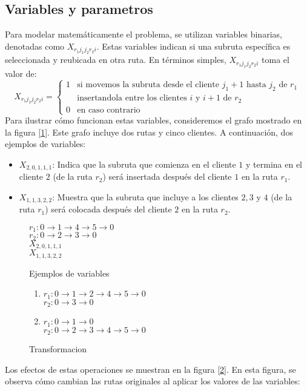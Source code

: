 \documentclass{article}
\begin{document}
\subsection {Variables y parametros}
Para modelar matemáticamente el problema, se utilizan variables binarias, denotadas como $X_{r_1 j_1 j_2 r_2 i}$. Estas variables indican si una subruta específica es seleccionada y reubicada en otra ruta. En términos simples, $X_{r_1 j_1 j_2 r_2 i}$ toma el valor de:
\[
 X_{r_1 j_1 j_2 r_2 i}= 
\begin{cases}  
    1 & \text{si movemos la subruta desde el cliente $j_1 +1 $ hasta $j_2$ de $r_1$} \\
       & \text{insertandola entre los clientes $i$ y $i+1$ de $r_2$}\\
    0 & \text{en caso contrario} 
\end{cases}
\]
Para ilustrar cómo funcionan estas variables, consideremos el grafo mostrado en la figura [\ref{fig:variables_example}]. Este grafo incluye dos rutas y cinco clientes. A continuación, dos ejemplos de variables:
\begin{itemize}
\item
$X_{2,0,1,1,1}$: Indica que la subruta que comienza en el cliente $1$ y termina en el cliente $2$ (de la ruta $r_2$) será insertada después del cliente $1$ en la ruta $r_1$.
\item
$X_{1,1,3,2,2}$: Muestra que la subruta que incluye a los clientes $2, 3$ y $4$ (de la ruta $r_1$) será colocada después del cliente $2$ en la ruta $r_2$.
\end{itemize}

\begin{figure}[h!]
    \vspace{0.5em}
$r_1:  0 \rightarrow 1\rightarrow 4 \rightarrow 5 \rightarrow 0$\\
$r_2:  0\rightarrow 2\rightarrow 3\rightarrow 0$\\
$X_{2,0,1,1,1}$\\
$X_{1,1,3,2,2}$\\
\caption{Ejemplos de variables}
\label{fig:variables_example}
\end{figure}

\begin{figure}[h!]
    \vspace{0.5em}
\begin{enumerate}
\item
$r_1:  0 \rightarrow 1\rightarrow 2\rightarrow 4 \rightarrow 5 \rightarrow 0$\\
$r_2:  0\rightarrow 3\rightarrow 0$\\
\item
$r_1:  0 \rightarrow 1 \rightarrow 0$\\
$r_2:  0\rightarrow 2\rightarrow 3 \rightarrow 4 \rightarrow 5\rightarrow 0$\\
\end{enumerate}
\caption{Transformacion}
\label{fig:transformation}
\end{figure}
Los efectos de estas operaciones se muestran en la figura [\ref{fig:transformation}]. En esta figura, se observa cómo cambian las rutas originales al aplicar los valores de las variables:
\end{document}
